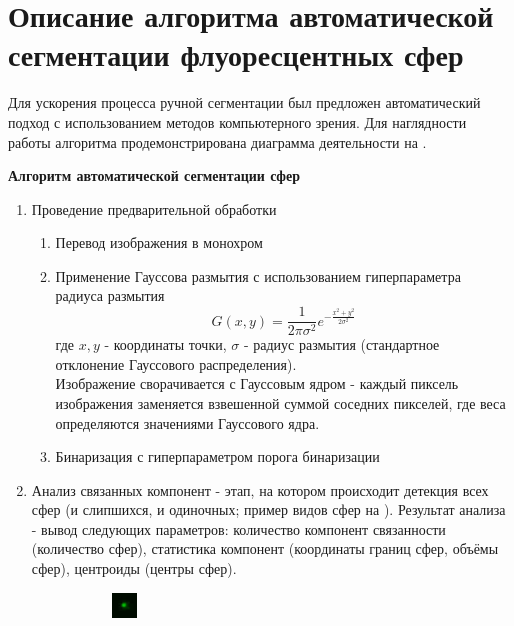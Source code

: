 \section{Описание алгоритма автоматической сегментации флуоресцентных сфер} \label{c2:sec2}
\par Для ускорения процесса ручной сегментации был предложен автоматический подход с использованием методов компьютерного зрения. Для наглядности работы алгоритма продемонстрирована диаграмма деятельности на .
\par \textbf{Алгоритм автоматической сегментации сфер}
\begin{enumerate}
	\item Проведение предварительной обработки
	\begin{enumerate}[]
		\item Перевод изображения в монохром
		\item Применение Гауссова размытия с использованием гиперпараметра радиуса размытия
		\begin{equation}
			G(x,y) = \frac{1}{2\pi\sigma^2}e^{-\frac{x^2+y^2}{2\sigma^2}}
		\end{equation}
		где $x, y$ - координаты точки, $\sigma$ - радиус размытия (стандартное отклонение Гауссового распределения).\\
		Изображение сворачивается с Гауссовым ядром -  каждый пиксель изображения заменяется взвешенной суммой соседних пикселей, где веса определяются значениями Гауссового ядра.
		\item Бинаризация с гиперпараметром порога бинаризации
	\end{enumerate}
	\item Анализ связанных компонент - этап, на котором происходит детекция всех сфер (и слипшихся, и одиночных; пример видов сфер на ). Результат анализа - вывод следующих параметров: количество компонент связанности (количество сфер), статистика компонент (координаты границ сфер, объёмы сфер), центроиды (центры сфер).
	\begin{figure}[H]
		\begin{subfigure}[t]{\dimexpr.5\linewidth-1.3em\relax}
			\centering
			\includegraphics[width=.35\linewidth,valign=t]{my_folder/images/autosegm/good_bead.png}

\end{subfigure}
\end{figure}
\end{enumerate}
